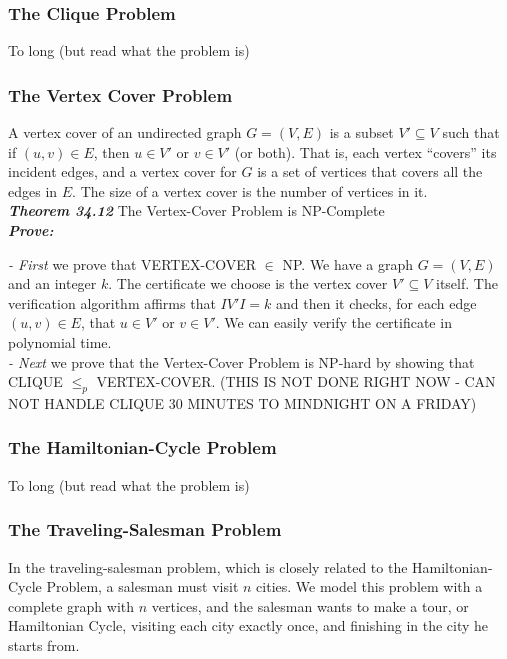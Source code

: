 \subsubsection{The Clique Problem}
To long (but read what the problem is)

\subsubsection{The Vertex Cover Problem}
A vertex cover of an undirected graph $G = (V, E)$ is a subset $V' \subseteq V$ such that if $(u, v) \in E$, then $u \in V'$ or $v \in V'$ (or both). That is, each vertex ``covers'' its incident edges, and a vertex cover for $G$ is a set of vertices that covers all the edges in $E$. The size of a vertex cover is the number of vertices in it.\\

\textbf{\textit{Theorem 34.12}}
The Vertex-Cover Problem is NP-Complete\\

\textbf{\textit{Prove:}}

\textit{- First} we prove that VERTEX-COVER $\in$ NP. We have a graph $G = (V, E)$ and an integer $k$. The certificate we choose is the vertex cover $V' \subseteq V$ itself. The verification algorithm affirms that $IV'I = k$ and then it checks, for each edge $(u, v) \in E$, that $u \in V'$ or $v \in V'$. We can easily verify the certificate in polynomial time. \\

\textit{- Next} we prove that the Vertex-Cover Problem is NP-hard by showing that CLIQUE $\leq_p$ VERTEX-COVER. (THIS IS NOT DONE RIGHT NOW - CAN NOT HANDLE CLIQUE 30 MINUTES TO MINDNIGHT ON A FRIDAY)

\subsubsection{The Hamiltonian-Cycle Problem}
To long (but read what the problem is)

\subsubsection{The Traveling-Salesman Problem}
In the traveling-salesman problem, which is closely related to the Hamiltonian-Cycle Problem, a salesman must visit $n$ cities. We model this problem with a complete graph with $n$ vertices, and the salesman wants to make a tour, or Hamiltonian Cycle, visiting each city exactly once, and finishing in the city he starts from. 

